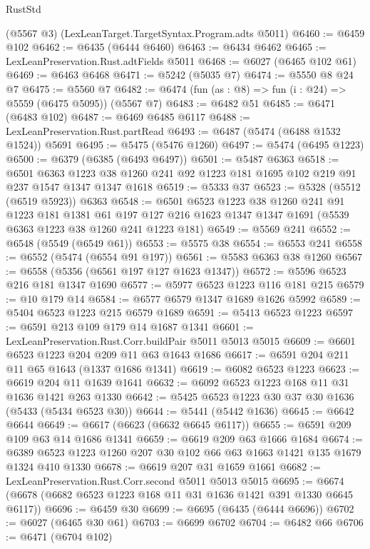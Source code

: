 \begin{lexlean}{RustStd}
\begin{coremodule}
    (@5567 @3)
    (LexLeanTarget.TargetSyntax.Program.adts @5011)
@6460 := @6459 @102
@6462 := @6435 (@6444 @6460)
@6463 := @6434 @6462
@6465 := LexLeanPreservation.Rust.adtFields @5011
@6468 := @6027 (@6465 @102 @61)
@6469 := @6463 @6468
@6471 := @5242 (@5035 @7)
@6474 := @5550 @8 @24 @7
@6475 := @5560 @7
@6482 := @6474 (fun (as : @8) => fun (i : @24) => @5559 (@6475 @5095)) (@5567 @7)
@6483 := @6482 @51
@6485 := @6471 (@6483 @102)
@6487 := @6469 @6485 @6117
@6488 := LexLeanPreservation.Rust.partRead
@6493 := @6487 (@5474 (@6488 @1532 @1524)) @5691
@6495 := @5475 (@5476 @1260)
@6497 := @5474 (@6495 @1223)
@6500 := @6379 (@6385 (@6493 @6497))
@6501 := @5487 @6363
@6518 := @6501
    @6363
    @1223
    @38
    @1260
    @241
    @92
    @1223
    @181
    @1695
    @102
    @219
    @91
    @237
    @1547
    @1347
    @1347
    @1618
@6519 := @5333 @37
@6523 := @5328 (@5512 (@6519 @5923)) @6363
@6548 := @6501
    @6523
    @1223
    @38
    @1260
    @241
    @91
    @1223
    @181
    @1381
    @61
    @197
    @127
    @216
    @1623
    @1347
    @1347
    @1691
    (@5539 @6363 @1223 @38 @1260 @241 @1223 @181)
@6549 := @5569 @241
@6552 := @6548 (@5549 (@6549 @61))
@6553 := @5575 @38
@6554 := @6553 @241
@6558 := @6552 (@5474 (@6554 @91 @197))
@6561 := @5583 @6363 @38 @1260
@6567 := @6558 (@5356 (@6561 @197 @127 @1623 @1347))
@6572 := @5596 @6523 @216 @181 @1347 @1690
@6577 := @5977 @6523 @1223 @116 @181 @215
@6579 := @10 @179 @14
@6584 := @6577 @6579 @1347 @1689 @1626 @5992
@6589 := @5404 @6523 @1223 @215 @6579 @1689
@6591 := @5413 @6523 @1223
@6597 := @6591 @213 @109 @179 @14 @1687 @1341
@6601 := LexLeanPreservation.Rust.Corr.buildPair @5011 @5013 @5015
@6609 := @6601 @6523 @1223 @204 @209 @11 @63 @1643 @1686
@6617 := @6591 @204 @211 @11 @65 @1643 (@1337 @1686 @1341)
@6619 := @6082 @6523 @1223
@6623 := @6619 @204 @11 @1639 @1641
@6632 := @6092 @6523 @1223 @168 @11 @31 @1636 @1421 @263 @1330
@6642 := @5425 @6523 @1223 @30 @37 @30 @1636 (@5433 (@5434 @6523 @30))
@6644 := @5441 (@5442 @1636)
@6645 := @6642 @6644
@6649 := @6617 (@6623 (@6632 @6645 @6117))
@6655 := @6591 @209 @109 @63 @14 @1686 @1341
@6659 := @6619 @209 @63 @1666 @1684
@6674 := @6389 @6523 @1223 @1260 @207 @30 @102 @66 @63 @1663 @1421 @135 @1679 @1324 @410 @1330
@6678 := @6619 @207 @31 @1659 @1661
@6682 := LexLeanPreservation.Rust.Corr.second @5011 @5013 @5015
@6695 := @6674 (@6678 (@6682 @6523 @1223 @168 @11 @31 @1636 @1421 @391 @1330 @6645 @6117))
@6696 := @6459 @30
@6699 := @6695 (@6435 (@6444 @6696))
@6702 := @6027 (@6465 @30 @61)
@6703 := @6699 @6702
@6704 := @6482 @66
@6706 := @6471 (@6704 @102)

\end{coremodule}
\end{lexlean}
